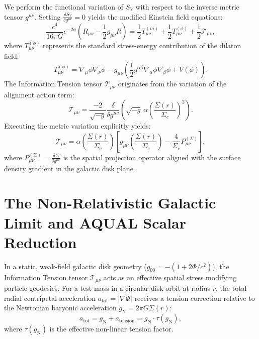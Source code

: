 \documentclass[11pt]{article}
\theoremstyle{definition}
\theoremstyle{remark}
\begin{document}
We perform the functional variation of $S_Y$ with respect to the inverse metric tensor $g^{\mu\nu}$. Setting $\frac{\delta S_Y}{\delta g^{\mu\nu}} = 0$ yields the modified Einstein field equations:
\begin{equation}
\frac{c^4}{16\pi G} e^{-2\phi} \left(R_{\mu\nu} - \frac{1}{2}g_{\mu\nu}R \right) = \frac{1}{2} T_{\mu\nu}^{(m)} + \frac{1}{2} T_{\mu\nu}^{(\phi)} + \frac{1}{2} \mathcal{T}_{\mu\nu},
\end{equation}
where $T_{\mu\nu}^{(\phi)}$ represents the standard stress-energy contribution of the dilaton field:
\begin{equation}
T_{\mu\nu}^{(\phi)} = \nabla_\mu\phi \nabla_\nu\phi - g_{\mu\nu}\left(\frac{1}{2}g^{\alpha\beta}\nabla_\alpha\phi\nabla_\beta\phi + V(\phi)\right).
\end{equation}
The Information Tension tensor $\mathcal{T}_{\mu\nu}$ originates from the variation of the alignment action term:
\begin{equation}
\mathcal{T}_{\mu\nu} = \frac{-2}{\sqrt{-g}} \frac{\delta}{\delta g^{\mu\nu}} \left( \sqrt{-g} \, \alpha \left(\frac{\Sigma(r)}{\Sigma_c}\right)^2 \right).
\end{equation}
Executing the metric variation explicitly yields:
\begin{equation}
\mathcal{T}_{\mu\nu} = \alpha \left(\frac{\Sigma(r)}{\Sigma_c}\right) \left[ g_{\mu\nu}\left(\frac{\Sigma(r)}{\Sigma_c}\right) - \frac{4}{\Sigma_c} P_{\mu\nu}^{(\Sigma)} \right],
\end{equation}
where $P_{\mu\nu}^{(\Sigma)} = \frac{\delta \Sigma}{\delta g^{\mu\nu}}$ is the spatial projection operator aligned with the surface density gradient in the galactic disk plane.

\section{The Non-Relativistic Galactic Limit and AQUAL Scalar Reduction}

In a static, weak-field galactic disk geometry ($g_{00} = -(1 + 2\Phi/c^2)$), the Information Tension tensor $\mathcal{T}_{\mu\nu}$ acts as an effective spatial stress modifying particle geodesics. For a test mass in a circular disk orbit at radius $r$, the total radial centripetal acceleration $a_{\text{tot}} = |\nabla \Phi|$ receives a tension correction relative to the Newtonian baryonic acceleration $g_{\text{N}} = 2\pi G \Sigma(r)$:
\begin{equation}
a_{\text{tot}} = g_{\text{N}} + a_{\text{tension}} = g_{\text{N}} \cdot \tau(g_{\text{N}}),
\end{equation}
where $\tau(g_{\text{N}})$ is the effective non-linear tension factor.
\end{document}
